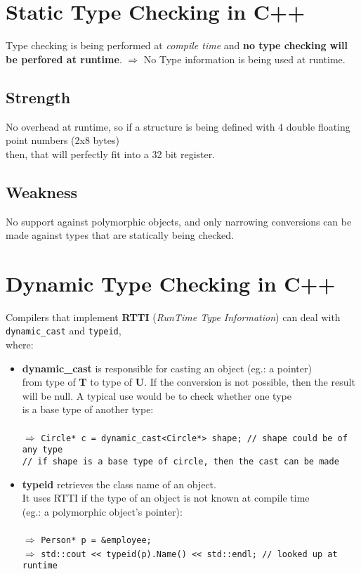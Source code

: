 \documentclass{article}
\begin{document}
 \section*{Static Type Checking in C++}
 Type checking is being performed at \textsl{compile time} and \textbf{no type checking will be perfored at runtime}.
 $\Rightarrow$ No Type information is being used at runtime.
 \subsection*{Strength}
 No overhead at runtime, so if a structure is being defined with 4 double floating point numbers (2x8 bytes)
 \\
 then, that will perfectly fit into a 32 bit register.
 \subsection*{Weakness}
 No support against polymorphic objects, and only narrowing conversions can be made against types
 that are statically being checked.
 
 \section*{Dynamic Type Checking in C++}
 Compilers that implement \textbf{RTTI} (\textsl{RunTime Type Information}) can deal with
 \texttt{dynamic\_cast} and \texttt{typeid},
 \\
 where: 
 \begin{itemize}
  \item \textbf{dynamic\_cast} is responsible for casting an object (eg.: a pointer) 
  \\
  from type of \textbf{T} to type of \textbf{U}. If the conversion is not possible,
  then the result will be null. A typical use would be to check whether one type 
  \\
  is a base type of another type:
  \\
  \\
  $\Rightarrow$ \texttt{Circle* c = dynamic\_cast<Circle*> shape; // shape could be of any type}
  \\
  \texttt{// if shape is a base type of circle, then the cast can be made}
  \item \textbf{typeid} retrieves the class name of an object.
  \\
  It uses RTTI if the type of an object is not known at compile time
  \\
  (eg.: a polymorphic object's pointer):
  \\
  \\
  $\Rightarrow$ \texttt{Person* p = \&employee;}
  \\
  $\Rightarrow$ \texttt{std::cout << typeid(p).Name() << std::endl; // looked up at runtime}
 \end{itemize}
\end{document}
